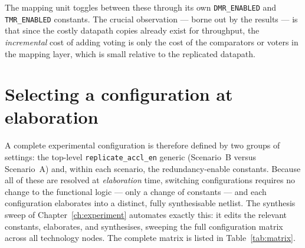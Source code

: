 The mapping unit toggles between these through its own \texttt{DMR\_ENABLED} and
\texttt{TMR\_ENABLED} constants. The crucial observation --- borne out by the
results --- is that since the costly datapath copies already exist for
throughput, the \emph{incremental} cost of adding voting is only the cost of the
comparators or voters in the mapping layer, which is small relative to the
replicated datapath.

\section{Selecting a configuration at elaboration}
\label{sec:ft-control}

A complete experimental configuration is therefore defined by two groups of
settings: the top-level \texttt{replicate\_accl\_en} generic (Scenario~B versus
Scenario~A) and, within each scenario, the redundancy-enable constants. Because
all of these are resolved at \emph{elaboration} time, switching configurations
requires no change to the functional logic --- only a change of constants --- and
each configuration elaborates into a distinct, fully synthesisable netlist. The
synthesis sweep of Chapter~\ref{ch:experiment} automates exactly this: it edits
the relevant constants, elaborates, and synthesises, sweeping the full
configuration matrix across all technology nodes. The complete matrix is listed
in Table~\ref{tab:matrix}.


